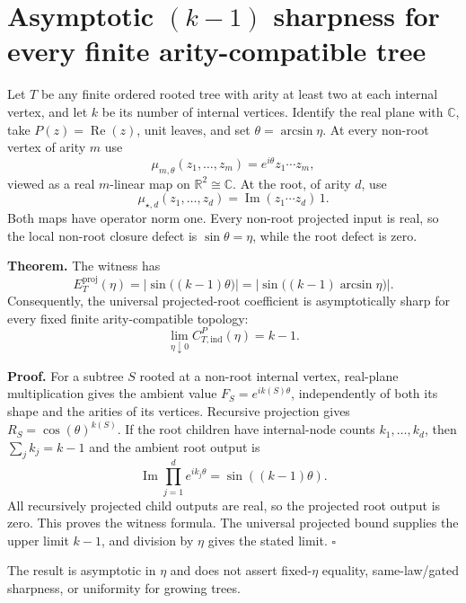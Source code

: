 \section*{Asymptotic $(k-1)$ sharpness for every finite arity-compatible tree}
\label{sec:m19-finite-arity-asymptotic}

Let $T$ be any finite ordered rooted tree with arity at least two at each
internal vertex, and let $k$ be its number of internal vertices.  Identify the
real plane with $\mathbb C$, take $P(z)=\operatorname{Re}(z)$, unit leaves,
and set $\theta=\arcsin\eta$.  At every non-root vertex of arity $m$ use
\[
  \mu_{m,\theta}(z_1,\ldots,z_m)=e^{i\theta}z_1\cdots z_m,
\]
viewed as a real $m$-linear map on $\mathbb R^2\cong\mathbb C$.  At the root,
of arity $d$, use
\[
  \mu_{\star,d}(z_1,\ldots,z_d)=
  \operatorname{Im}(z_1\cdots z_d)\,1.
\]
Both maps have operator norm one.  Every non-root projected input is real, so
the local non-root closure defect is $\sin\theta=\eta$, while the root defect
is zero.

\textbf{Theorem.}  The witness has
\[
  E_T^{\mathrm{proj}}(\eta)=
  \left|\sin\bigl((k-1)\theta\bigr)\right|
  =\left|\sin\bigl((k-1)\arcsin\eta\bigr)\right|.
\]
Consequently, the universal projected-root coefficient is asymptotically
sharp for every fixed finite arity-compatible topology:
\[
  \boxed{\displaystyle
  \lim_{\eta\downarrow0}C_{T,\mathrm{ind}}^P(\eta)=k-1.}
\]

\textbf{Proof.}  For a subtree $S$ rooted at a non-root internal vertex,
real-plane multiplication gives the ambient value
$F_S=e^{ik(S)\theta}$, independently of both its shape and the arities of
its vertices.  Recursive projection gives $R_S=\cos(\theta)^{k(S)}$.
If the root children have internal-node counts $k_1,\ldots,k_d$, then
$\sum_j k_j=k-1$ and the ambient root output is
\[
 \operatorname{Im}\prod_{j=1}^d e^{ik_j\theta}
 =\sin((k-1)\theta).
\]
All recursively projected child outputs are real, so the projected root
output is zero.  This proves the witness formula.  The universal projected
bound supplies the upper limit $k-1$, and division by $\eta$ gives the stated
limit.
\hfill$\square$

The result is asymptotic in $\eta$ and does not assert fixed-$\eta$ equality,
same-law/gated sharpness, or uniformity for growing trees.
